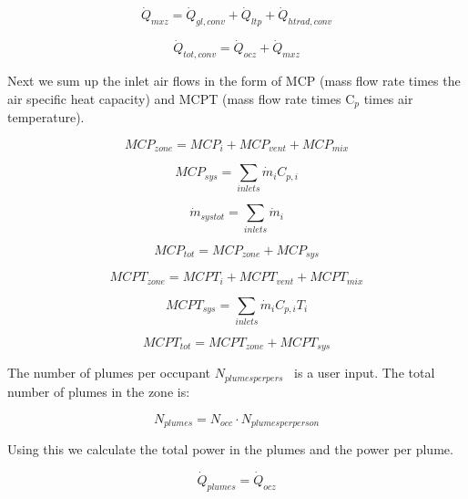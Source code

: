 {\begin{equation}
{\dot Q_{mxz}} = {\dot Q_{gl,conv}} + {\dot Q_{ltp}} + {\dot Q_{htrad,conv}}
\end{equation}

\begin{equation}
{\dot Q_{tot,conv}} = {\dot Q_{ocz}} + {\dot Q_{mxz}}
\end{equation}

Next we sum up the inlet air flows in the form of MCP (mass flow rate times the air specific heat capacity) and MCPT (mass flow rate times C\(_{p}\) times air temperature).

\begin{equation}
MC{P_{zone}} = MC{P_i} + MC{P_{vent}} + MC{P_{mix}}
\end{equation}

\begin{equation}
MC{P_{sys}} = \sum\limits_{inlets} {{{\dot m}_i}} {C_{p,i}}
\end{equation}

\begin{equation}
{\dot m_{systot}} = \sum\limits_{inlets} {{{\dot m}_i}}
\end{equation}

\begin{equation}
MC{P_{tot}} = MC{P_{zone}} + MC{P_{sys}}
\end{equation}

\begin{equation}
MCP{T_{zone}} = MCP{T_i} + MCP{T_{vent}} + MCP{T_{mix}}
\end{equation}

\begin{equation}
MCP{T_{sys}} = \sum\limits_{inlets} {{{\dot m}_i}} {C_{p,i}}{T_i}
\end{equation}

\begin{equation}
MCP{T_{tot}} = MCP{T_{zone}} + MCP{T_{sys}}
\end{equation}

The number of plumes per occupant \({N_{plumesperpers}}\) ~is a user input. The total number of plumes in the zone is:

\begin{equation}
{N_{plumes}} = {N_{occ}} \cdot {N_{plumesperperson}}
\end{equation}

Using this we calculate the total power in the plumes and the power per plume.

\begin{equation}
{\dot Q_{plumes}} = {\dot Q_{ocz}}
\end{equation}

}
